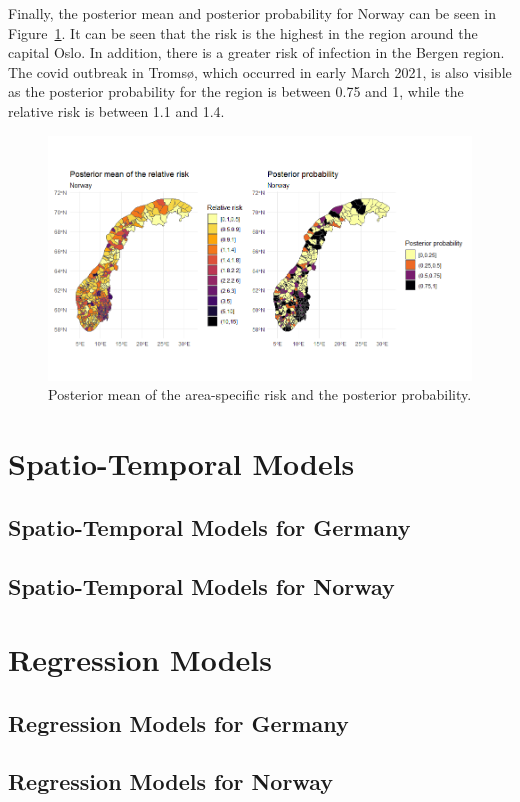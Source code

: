 Finally, the posterior mean and posterior probability for Norway can be seen in Figure~\ref{posteriorNorway}. It can be seen that the risk is the highest in the region around the capital Oslo. In addition, there is a greater risk of infection in the Bergen region. The covid outbreak in Tromsø, which occurred in early March 2021, is also visible as the posterior probability for the region is between 0.75 and 1, while the relative risk is between 1.1 and 1.4.
\begin{figure}[H]
    \centering
    \includegraphics[width = \textwidth]{posterior_norway.png}
    \caption{Posterior mean of the area-specific risk and the posterior probability.}
    \label{posteriorNorway}
\end{figure}
%     
\clearpage
\section{Spatio-Temporal Models}
\subsection{Spatio-Temporal Models for Germany}
\subsection{Spatio-Temporal Models for Norway}
\section{Regression Models}
\clearpage
\subsection{Regression Models for Germany}
\subsection{Regression Models for Norway}